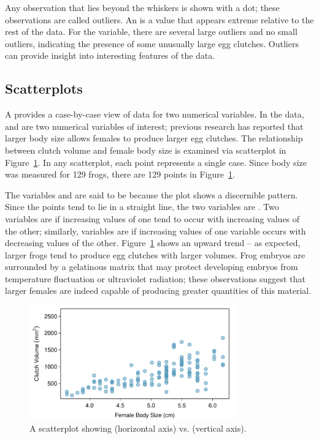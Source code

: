 \begin{doublespace}
Any observation that lies beyond the whiskers is shown with a dot; these observations are called outliers. An  is a value that appears extreme relative to the rest of the data. For the  variable, there are several large outliers and no small outliers, indicating the presence of some unusually large egg clutches. Outliers can provide insight into interesting features of the data. 

\subsection{Scatterplots}
\label{scatterPlots}

A  provides a case-by-case view of data for two numerical variables. In the  data,  and  are two numerical variables of interest; previous research has reported that larger body size allows females to produce larger egg clutches. The relationship between clutch volume and female body size is examined via scatterplot in Figure~\ref{frogClutchVolBodySize}. In any scatterplot, each point represents a single case. Since body size was measured for 129 frogs, there are 129 points in Figure~\ref{frogClutchVolBodySize}.

The variables  and  are said to be  because the plot shows a discernible pattern. Since the points tend to lie in a straight line, the two variables are . Two variables are  if increasing values of one tend to occur with increasing values of the other; similarly, variables are  if increasing values of one variable occurs with decreasing values of the other. Figure~\ref{frogClutchVolBodySize} shows an upward trend -- as expected, larger frogs tend to produce egg clutches with larger volumes. Frog embryos are surrounded by a gelatinous matrix that may protect developing embryos from temperature fluctuation or ultraviolet radiation; these observations suggest that larger females are indeed capable of producing greater quantities of this material.

\begin{figure}
\centering
\includegraphics[width=0.8\textwidth]
{ch_intro_to_data_oi_biostat/figures/frogClutchVolBodySize/frogClutchVolBodySize}
\caption{A scatterplot showing  (horizontal axis) vs.  (vertical axis). }
\label{frogClutchVolBodySize}
\end{figure}


\end{doublespace}
